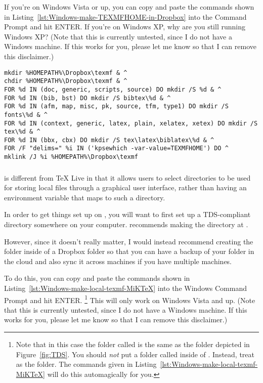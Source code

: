 If you're on Windows Vista or up, you can copy and paste the commands shown in Listing~\ref{lst:Windows-make-TEXMFHOME-in-Dropbox} into the Command Prompt and hit ENTER.
If you're on Windows XP, why are you still running Windows XP?
(Note that this is currently untested, since I do not have a Windows machine.
If this works for you, please let me know so that I can remove this disclaimer.)

\begin{listing}[htbp]
	\centering
	\begin{verbatim}
mkdir %HOMEPATH%\Dropbox\texmf & ^
chdir %HOMEPATH%\Dropbox\texmf & ^
FOR %d IN (doc, generic, scripts, source) DO mkdir /S %d & ^
FOR %d IN (bib, bst) DO mkdir /S bibtex\%d & ^
FOR %d IN (afm, map, misc, pk, source, tfm, type1) DO mkdir /S fonts\%d & ^
FOR %d IN (context, generic, latex, plain, xelatex, xetex) DO mkdir /S tex\%d & ^
FOR %d IN (bbx, cbx) DO mkdir /S tex\latex\biblatex\%d & ^
FOR /F "delims=" %i IN ('kpsewhich -var-value=TEXMFHOME') DO ^
mklink /J %i %HOMEPATH%\Dropbox\texmf
	\end{verbatim}
	\caption{Make a TDS-compliant directory in Dropbox and symlink it into TEXMFHOME on Windows}
	\label{lst:Windows-make-TEXMFHOME-in-Dropbox}
\end{listing}

\subsubsection{}
\label{subsubsec:local-files:miktex}

 is different from TeX Live in that it allows users to select directories to be used for storing local files through a graphical user interface, rather than having an environment variable that maps to such a directory.

In order to get things set up on , you will want to first set up a TDS-compliant directory somewhere on your computer.
 recommends making the directory at .

However, since it doesn't really matter, I would instead recommend creating the  folder inside of a Dropbox folder so that you can have a backup of your  folder in the cloud and also sync it across machines if you have multiple machines.

To do this, you can copy and paste the commands shown in Listing~\ref{lst:Windows-make-local-texmf-MiKTeX} into the Windows Command Prompt and hit ENTER.%
\footnote{%
Note that in this case the folder called  is the same as the  folder depicted in Figure~\ref{fig:TDS}.
You should \emph{not} put a folder called  inside of .
Instead, treat  as the  folder.
The commands given in Listing~\ref{lst:Windows-make-local-texmf-MiKTeX} will do this automagically for you.%
}
This will only work on Windows Vista and up.
(Note that this is currently untested, since I do not have a Windows machine.
If this works for you, please let me know so that I can remove this disclaimer.)

